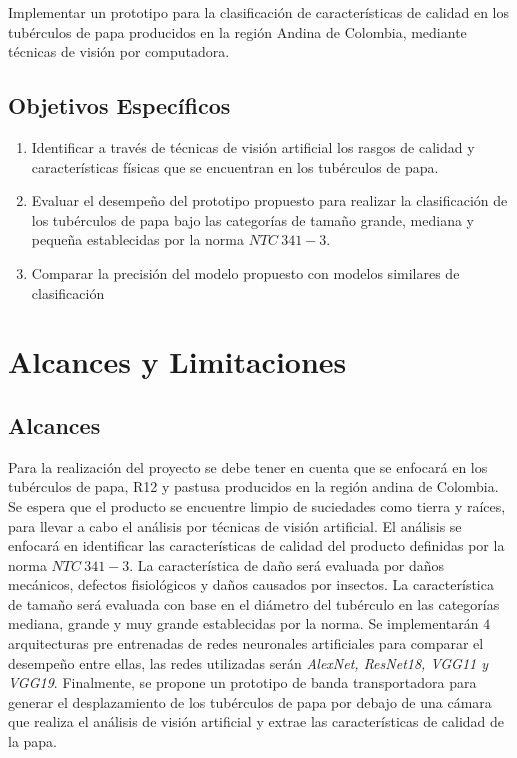 Implementar un prototipo para la clasificación de características de calidad en los tubérculos de papa producidos en la región Andina de Colombia, mediante técnicas de visión por computadora.

\subsection{Objetivos Específicos}
\begin{enumerate}
	\item Identificar a través de técnicas de visión artificial los rasgos de calidad y características físicas que se encuentran en los tubérculos de papa. 
	\item Evaluar el desempeño del prototipo propuesto para realizar la clasificación de los tubérculos de papa bajo las categorías de tamaño grande, mediana y pequeña establecidas por la norma $NTC \ 341-3$. 
	\item Comparar la precisión del modelo propuesto con modelos similares de clasificación
\end{enumerate}

\section{Alcances y Limitaciones}

\subsection{Alcances}

Para la realización del proyecto se debe tener en cuenta que se enfocará en los tubérculos de papa, R12 y pastusa producidos en la región andina de Colombia. Se espera que el producto se encuentre limpio de suciedades como tierra y raíces, para llevar a cabo el análisis por técnicas de visión artificial. El análisis se enfocará en identificar las características de calidad del producto definidas por la norma $NTC \ 341-3$. La característica de daño será evaluada por daños mecánicos, defectos fisiológicos y daños causados por insectos. La característica de tamaño será evaluada con base en el diámetro del tubérculo en las categorías mediana, grande y muy grande establecidas por la norma. Se implementarán $4$ arquitecturas pre entrenadas de redes neuronales artificiales para comparar el desempeño entre ellas, las redes utilizadas serán \textit{AlexNet, ResNet18, VGG11 y VGG19}. Finalmente, se propone un prototipo de banda transportadora para generar el desplazamiento de los tubérculos de papa por debajo de una cámara que realiza el análisis de visión artificial y extrae las características de calidad de la papa.

